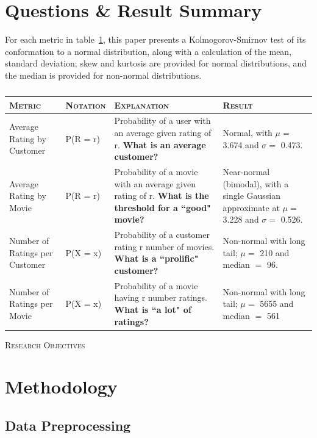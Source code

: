 \documentclass[prodmode,acmtecs]{acmsmall}
\begin{document}
\medskip


\section{Questions \& Result Summary}

For each metric in table~\ref{table:one}, this paper presents a Kolmogorov-Smirnov test of its conformation to a normal distribution, along with a calculation of the mean, standard deviation; skew and kurtosis are provided for normal distributions, and the median is provided for non-normal distributions.

\begin{table}
\begin{center}
    \begin{tabular}{ | p{1.6cm} | l | p{4.5cm} | p{4cm} |}
    \hline
    \textsc{Metric} & \textsc{Notation} & \textsc{Explanation} & \textsc{Result} \\ \hline
    Average Rating by Customer & P(R = r) &  Probability of a user with an average given rating of r. \textbf{What is an average customer?} & Normal, with $\mu=$ 3.674 and $\sigma=$ 0.473. \\ \hline
    Average Rating by Movie &  P(R = r) & Probability of a movie with an average given rating of r. \textbf{What is the threshold for a ``good" movie?}  & Near-normal (bimodal), with a single Gaussian approximate at $\mu=$ 3.228 and $\sigma=$ 0.526. \\ \hline
   Number of Ratings per Customer & P(X = x) & Probability of a customer rating r number of movies. \textbf{What is a ``prolific" customer?} & Non-normal with long tail; $\mu=$ 210 and median $=$ 96. \\ \hline
    Number of Ratings per Movie & P(X = x) &  Probability of a movie having r number ratings. \textbf{What is ``a lot" of ratings?} & Non-normal with long tail; $\mu=$ 5655 and median $=$ 561  \\
    \hline
    \end{tabular}
\textsc{Research Objectives}
\end{center}
\caption{}
\label{table:one}
\end{table}

\medskip

\section{Methodology}

\subsection{Data Preprocessing}
\end{document}
